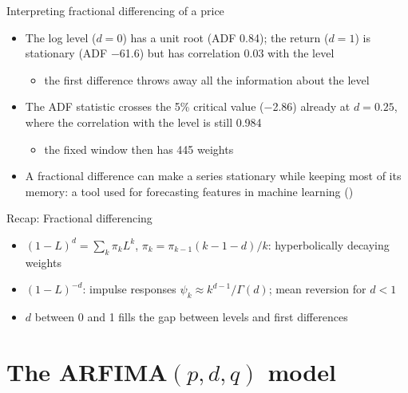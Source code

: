 \begin{frame}{Interpreting fractional differencing of a price}
\itemsize{\small}
\begin{itemize}
    \item The log level ($d = 0$) has a unit root (ADF 0.84); the return ($d = 1$) is stationary (ADF $-$61.6) but has correlation 0.03 with the level
    \begin{itemize}
        \item the first difference throws away all the information about the level
    \end{itemize}
    \item The ADF statistic crosses the 5\% critical value ($-$2.86) already at $d = 0.25$, where the correlation with the level is still 0.984
    \begin{itemize}
        \item the fixed window then has 445 weights
    \end{itemize}
    \item A fractional difference can make a series stationary while keeping most of its memory: a tool used for forecasting features in machine learning ()
\end{itemize}
\end{frame}

\begin{frame}{Recap: Fractional differencing}
\itemsize{\small}
\begin{itemize}
    \item $(1-L)^d = \sum_k\pi_k L^k$, $\pi_k = \pi_{k-1}(k-1-d)/k$: hyperbolically decaying weights
    \item $(1-L)^{-d}$: impulse responses $\psi_k \approx k^{d-1}/\Gamma(d)$; mean reversion for $d < 1$
    \item $d$ between 0 and 1 fills the gap between levels and first differences
\end{itemize}
\end{frame}


\section{The ARFIMA$(p,d,q)$ model}

